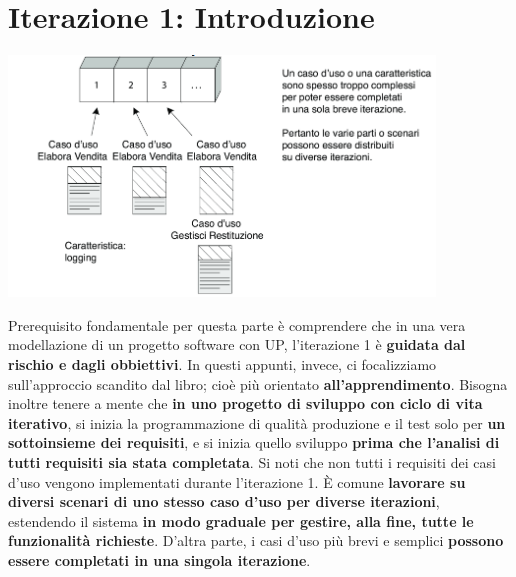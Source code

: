 \documentclass[12pt]{article}
\begin{document}
\section{Iterazione 1: Introduzione}
\begin{center}
    \includegraphics[width = 0.85\textwidth]{Images/45.png}
\end{center}
Prerequisito fondamentale per questa parte è comprendere che in una vera modellazione di un progetto software con UP, l'iterazione 1 è \textbf{guidata dal rischio e dagli obbiettivi}.
In questi appunti, invece, ci focalizziamo sull'approccio scandito dal libro; cioè più orientato \textbf{all'apprendimento}.
Bisogna inoltre tenere a mente che \textbf{in uno progetto di sviluppo con ciclo di vita iterativo}, si inizia la programmazione di qualità produzione e il test solo per \textbf{un sottoinsieme dei requisiti},
e si inizia quello sviluppo \textbf{prima che l'analisi di tutti requisiti sia stata completata}.
Si noti che non tutti i requisiti dei casi d'uso vengono implementati durante l'iterazione 1. È comune \textbf{lavorare su diversi scenari di uno stesso caso d'uso per diverse iterazioni}, estendendo il sistema \textbf{in modo graduale per gestire, alla fine, tutte le funzionalità richieste}.
D'altra parte, i casi d'uso più brevi e semplici \textbf{possono essere completati in una singola iterazione}.
\end{document}
